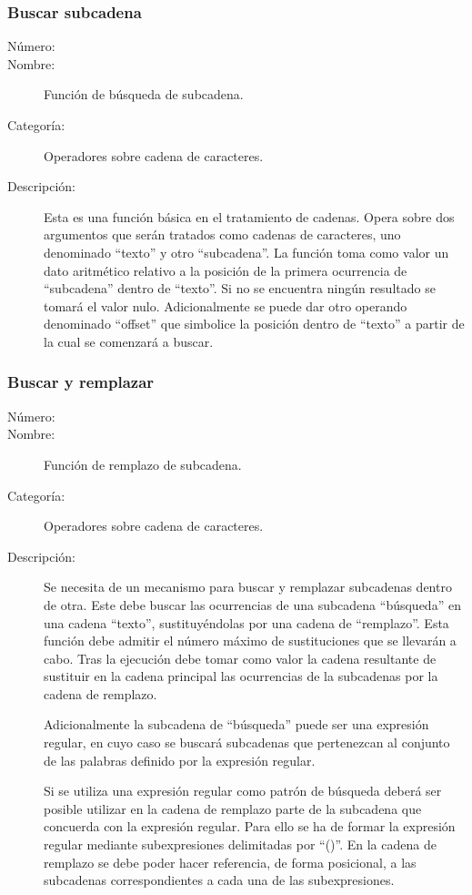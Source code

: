 \subsubsection{Buscar subcadena}
\begin{framed}
	\begin{description}
		\item [Número:] \cn
		\item [Nombre:] Función de búsqueda de subcadena.
		\item [Categoría:] Operadores sobre cadena de caracteres.
		\item [Descripción:] Esta es una función básica en el tratamiento de cadenas. Opera sobre dos argumentos
		que serán tratados como cadenas de caracteres, uno denominado ``texto'' y otro ``subcadena''. La función
		toma como valor un dato aritmético relativo a la posición de la primera ocurrencia de ``subcadena'' dentro
		de ``texto''. Si no se encuentra ningún resultado se tomará el valor nulo. Adicionalmente se puede dar otro
		operando denominado ``offset'' que simbolice la posición dentro de ``texto'' a partir de la cual se comenzará a buscar.
	\end {description}
\end{framed}

\subsubsection{Buscar y remplazar}
\begin{framed}
	\begin{description}
		\item [Número:] \cn
		\item [Nombre:] Función de remplazo de subcadena.
		\item [Categoría:] Operadores sobre cadena de caracteres.
		\item [Descripción:] Se necesita de un mecanismo para buscar y remplazar subcadenas dentro de otra.
		Este debe buscar las ocurrencias de una subcadena ``búsqueda'' en una
		cadena ``texto'', sustituyéndolas por una cadena de ``remplazo''. Esta función debe admitir
		el número máximo de sustituciones que se llevarán a cabo. Tras la ejecución debe tomar como valor la cadena
		resultante de sustituir en la cadena principal las ocurrencias de la subcadenas por la cadena de remplazo.

		Adicionalmente la subcadena de ``búsqueda'' puede ser una expresión regular, en cuyo caso
		se buscará subcadenas que pertenezcan al conjunto de las palabras definido por la
		expresión regular.
		
		Si se utiliza una expresión regular como patrón de búsqueda deberá ser posible
		utilizar en la cadena de remplazo parte de la subcadena
		que concuerda con la expresión regular. Para ello se ha de formar la expresión regular mediante
		subexpresiones delimitadas por ``()''. En la cadena de remplazo se debe poder hacer referencia,
		de forma posicional, a las subcadenas correspondientes a cada una de las subexpresiones.
	\end {description}
\end{framed}


